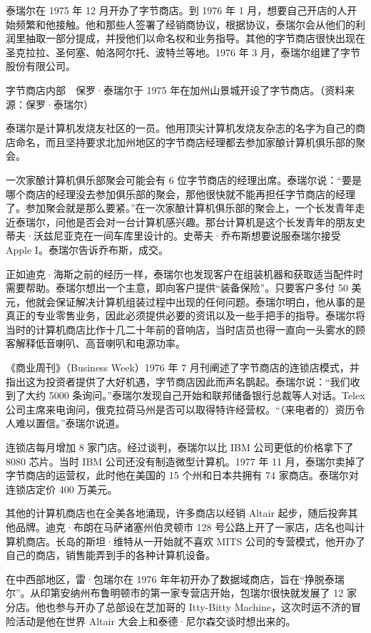 \documentclass[12pt,UTF8]{ctexbook}
\begin{document}
泰瑞尔在 1975 年 12 月开办了字节商店。到 1976 年 1 月，想要自己开店的人开始频繁和他接触。他和那些人签署了经销商协议，根据协议，泰瑞尔会从他们的利润里抽取一部分提成，并授他们以命名权和业务指导。其他的字节商店很快出现在圣克拉拉、圣何塞、帕洛阿尔托、波特兰等地。1976 年 3 月，泰瑞尔组建了字节股份有限公司。



字节商店内部　保罗·泰瑞尔于 1975 年在加州山景城开设了字节商店。（资料来源：保罗·泰瑞尔）

泰瑞尔是计算机发烧友社区的一员。他用顶尖计算机发烧友杂志的名字为自己的商店命名，而且坚持要求北加州地区的字节商店经理都去参加家酿计算机俱乐部的聚会。

一次家酿计算机俱乐部聚会可能会有 6 位字节商店的经理出席。泰瑞尔说：“要是哪个商店的经理没去参加俱乐部的聚会，那他很快就不能再担任字节商店的经理了。参加聚会就是那么要紧。”在一次家酿计算机俱乐部的聚会上，一个长发青年走近泰瑞尔，问他是否会对一台计算机感兴趣。那台计算机是这个长发青年的朋友史蒂夫·沃兹尼亚克在一间车库里设计的。史蒂夫·乔布斯想要说服泰瑞尔接受 Apple I。泰瑞尔告诉乔布斯，成交。

正如迪克·海斯之前的经历一样，泰瑞尔也发现客户在组装机器和获取适当配件时需要帮助。泰瑞尔想出一个主意，即向客户提供“装备保险”。只要客户多付 50 美元，他就会保证解决计算机组装过程中出现的任何问题。泰瑞尔明白，他从事的是真正的专业零售业务，因此必须提供必要的资讯以及一些手把手的指导。泰瑞尔将当时的计算机商店比作十几二十年前的音响店，当时店员也得一直向一头雾水的顾客解释低音喇叭、高音喇叭和电源功率。

《商业周刊》（Business Week）1976 年 7 月刊阐述了字节商店的连锁店模式，并指出这为投资者提供了大好机遇，字节商店因此而声名鹊起。泰瑞尔说：“我们收到了大约 5000 条询问。”泰瑞尔发现自己开始和联邦储备银行总裁等人对话。Telex 公司主席来电询问，俄克拉荷马州是否可以取得特许经营权。“（来电者的）资历令人难以置信。”泰瑞尔说道。

连锁店每月增加 8 家门店。经过谈判，泰瑞尔以比 IBM 公司更低的价格拿下了 8080 芯片。当时 IBM 公司还没有制造微型计算机。1977 年 11 月，泰瑞尔卖掉了字节商店的运营权，此时他在美国的 15 个州和日本共拥有 74 家商店。泰瑞尔对连锁店定价 400 万美元。

其他的计算机商店也在全美各地涌现，许多商店以经销 Altair 起步，随后投奔其他品牌。迪克·布朗在马萨诸塞州伯灵顿市 128 号公路上开了一家店，店名也叫计算机商店。长岛的斯坦·维特从一开始就不喜欢 MITS 公司的专营模式，他开办了自己的商店，销售能弄到手的各种计算机设备。

在中西部地区，雷·包瑞尔在 1976 年年初开办了数据域商店，旨在“挣脱泰瑞尔”。从印第安纳州布鲁明顿市的第一家专营店开始，包瑞尔很快就发展了 12 家分店。他也参与开办了总部设在芝加哥的 Itty-Bitty Machine，这次时运不济的冒险活动是他在世界 Altair 大会上和泰德·尼尔森交谈时想出来的。
\end{document}
